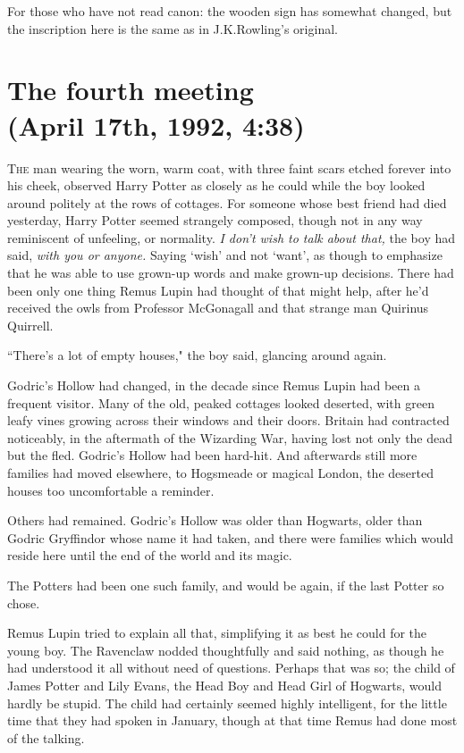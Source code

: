 
\begin{chapterOpeningAuthorNote}
For those who have not read canon: the wooden sign has somewhat changed, but the inscription here is the same as in J.\?K.\?Rowling's original.
\end{chapterOpeningAuthorNote}

\section{The fourth meeting\\
(April 17th, 1992, 4:38\pm)}

\lettrine{T}{he} man wearing the worn, warm coat, with three faint scars etched forever into his cheek, observed Harry Potter as closely as he could while the boy looked around politely at the rows of cottages. For someone whose best friend had died yesterday, Harry Potter seemed strangely composed, though not in any way reminiscent of unfeeling, or normality. \emph{I don't wish to talk about that,} the boy had said, \emph{with you or anyone.} Saying `wish' and not `want', as though to emphasize that he was able to use grown-up words and make grown-up decisions. There had been only one thing Remus Lupin had thought of that might help, after he'd received the owls from Professor McGonagall and that strange man Quirinus Quirrell.

``There's a lot of empty houses," the boy said, glancing around again.

Godric's Hollow had changed, in the decade since Remus Lupin had been a frequent visitor. Many of the old, peaked cottages looked deserted, with green leafy vines growing across their windows and their doors. Britain had contracted noticeably, in the aftermath of the Wizarding War, having lost not only the dead but the fled. Godric's Hollow had been hard-hit. And afterwards still more families had moved elsewhere, to Hogsmeade or magical London, the deserted houses too uncomfortable a reminder.

Others had remained. Godric's Hollow was older than Hogwarts, older than Godric Gryffindor whose name it had taken, and there were families which would reside here until the end of the world and its magic.

The Potters had been one such family, and would be again, if the last Potter so chose.

Remus Lupin tried to explain all that, simplifying it as best he could for the young boy. The Ravenclaw nodded thoughtfully and said nothing, as though he had understood it all without need of questions. Perhaps that was so; the child of James Potter and Lily Evans, the Head Boy and Head Girl of Hogwarts, would hardly be stupid. The child had certainly seemed highly intelligent, for the little time that they had spoken in January, though at that time Remus had done most of the talking.

